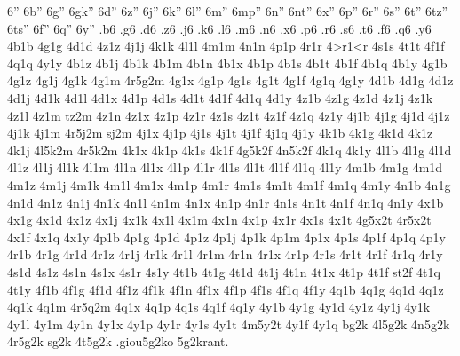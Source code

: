 {6''
6b''
6g''
6gk''
6d''
6z''
6j''
6k''
6l''
6m''
6mp''
6n''
6nt''
6x''
6p''
6r''
6s''
6t''
6tz''
6ts''
6f''
6q''
6y''
.b6
.g6
.d6
.z6
.j6
.k6
.l6
.m6
.n6
.x6
.p6
.r6
.s6
.t6
.f6
.q6
.y6
4b1b
4g1g
4d1d
4z1z
4j1j
4k1k
4l1l
4m1m
4n1n
4p1p
4r1r
4>r1<r
4s1s
4t1t
4f1f
4q1q
4y1y
4b1z
4b1j
4b1k
4b1m
4b1n
4b1x
4b1p
4b1s
4b1t
4b1f
4b1q
4b1y
4g1b
4g1z
4g1j
4g1k
4g1m
4r5g2m %
4g1x
4g1p
4g1s
4g1t
4g1f
4g1q
4g1y
4d1b
4d1g
4d1z
4d1j
4d1k
4d1l 
4d1x
4d1p
4d1s
4d1t
4d1f
4d1q
4d1y
4z1b %
4z1g %
4z1d
4z1j
4z1k
4z1l
4z1m
tz2m %
4z1n
4z1x
4z1p
4z1r
4z1s
4z1t
4z1f
4z1q
4z1y
4j1b
4j1g
4j1d
4j1z
4j1k
4j1m
4r5j2m %
sj2m   %
4j1x
4j1p
4j1s
4j1t
4j1f
4j1q
4j1y
4k1b %
4k1g
4k1d
4k1z
4k1j
4l5k2m %
4r5k2m %
4k1x
4k1p
4k1s
4k1f
4g5k2f %
4n5k2f %
4k1q
4k1y
4l1b
4l1g
4l1d
4l1z
4l1j
4l1k
4l1m
4l1n
4l1x
4l1p
4l1r
4l1s
4l1t
4l1f
4l1q
4l1y
4m1b
4m1g
4m1d
4m1z
4m1j
4m1k
4m1l
4m1x
4m1p
4m1r
4m1s
4m1t
4m1f
4m1q
4m1y
4n1b
4n1g
4n1d
4n1z
4n1j
4n1k
4n1l
4n1m
4n1x
4n1p
4n1r
4n1s
4n1t
4n1f
4n1q
4n1y
4x1b
4x1g
4x1d
4x1z
4x1j
4x1k
4x1l
4x1m
4x1n
4x1p
4x1r
4x1s
4x1t
4g5x2t %
4r5x2t %
4x1f
4x1q
4x1y
4p1b
4p1g
4p1d
4p1z
4p1j
4p1k
4p1m
4p1x
4p1s
4p1f
4p1q
4p1y
4r1b
4r1g
4r1d
4r1z
4r1j
4r1k
4r1l
4r1m
4r1n
4r1x
4r1p
4r1s
4r1t
4r1f
4r1q
4r1y
4s1d %
4s1z 
4s1n %
4s1x
4s1r
4s1y
4t1b
4t1g
4t1d
4t1j
4t1n
4t1x
4t1p
4t1f
st2f %
4t1q
4t1y
4f1b
4f1g
4f1d
4f1z
4f1k %
4f1n
4f1x
4f1p
4f1s
4f1q
4f1y
4q1b
4q1g
4q1d
4q1z
4q1k
4q1m
4r5q2m %
4q1x
4q1p
4q1s
4q1f
4q1y
4y1b
4y1g
4y1d
4y1z
4y1j
4y1k
4y1l
4y1m
4y1n
4y1x
4y1p
4y1r
4y1s
4y1t
4m5y2t %
4y1f
4y1q
bg2k
4l5g2k
4n5g2k
4r5g2k
sg2k
4t5g2k
.giou5g2ko   %
5g2krant.    %
}
